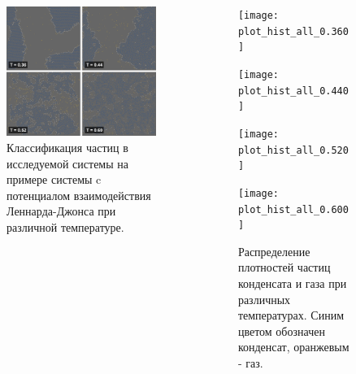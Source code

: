 \documentclass[pdf,hyperref={unicode}]{beamer}
\begin{document}
\begin{frame}
\transdissolve[duration=0.2]
\begin{columns}


\begin{column}{0.5\linewidth}
{
\begin{figure}[h]
\begin{center}
\includegraphics[width=\textwidth]{classification}
\caption{Классификация частиц в исследуемой системы на примере системы c потенциалом взаимодействия Леннарда-Джонса при различной температуре.}
\label{risClassExp}
\end{center}
\end{figure}
}
\end{column}

\begin{column}{0.65\linewidth}
{
\begin{figure}[h]
\begin{center}

\begin{minipage}[h]{0.47\linewidth}
\texttt{[image: plot\_hist\_all\_0.360]}
\end{minipage}
\begin{minipage}[h]{0.47\linewidth}
\texttt{[image: plot\_hist\_all\_0.440]}
\end{minipage}

\begin{minipage}[h]{0.47\linewidth}
\texttt{[image: plot\_hist\_all\_0.520]}
\end{minipage}
\begin{minipage}[h]{0.47\linewidth}
\texttt{[image: plot\_hist\_all\_0.600]}
\end{minipage}
\caption{Распределение плотностей частиц конденсата и газа при различных температурах. Синим цветом обозначен конденсат, оранжевым  - газ.}
\label{risRhoM}
\end{center}
\end{figure}
}
\end{column}

\end{columns}
\end{frame}
\end{document}
